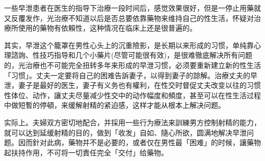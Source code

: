 \documentclass[12pt,UTF8]{ctexbook}
\begin{document}
一些早泄患者在医生的指导下治療一段时间后，感觉效果很好，但是一停止用藥就又反覆发作，光治療不知道以后是否总要依靠藥物来维持自己的性生活，怀疑对治療所使用的藥物有依賴性，这种情况在临床上还是很普遍的。

其实，早泄这个籠罩在男性心头上的沉重險影，是长期以来形成的习惯，单纯靠心理諮詢、性技巧指导和几个小藥片(尽管可能很有效)，是很难徹底解决所有问题的，光治療也不可能完全扭转多年来形成的早泄习惯，必须要重新建立新的性生活「习惯」。丈夫一定要将自己的困难告訴妻子，以得到妻子的諒解。治療丈夫的早泄，妻子是最好的医生，妻子有义务也有權利，在性交时督促丈夫改变以往的习惯性体位、动作，讓丈夫尽量减少性交中的动作幅度和頻度，甚至可以在性生活过程中做短暫的停頓，来缓解射精的紧迫感，这样才能从根本上解决问题。

实际上。夫婦双方密切地配合，并採用一些行为療法来訓練男方控制射精的能力，就可以达到延缓射精的目的，做到「收发」自如、隨心所欲，圆满地解决早泄问题。因而針对此病，藥物并不是必要的，或者仅在男性最「困难」的时候，讓藥物起扶持作用，不可将一切責任完全「交付」给藥物。

\backmatter
\end{document}
